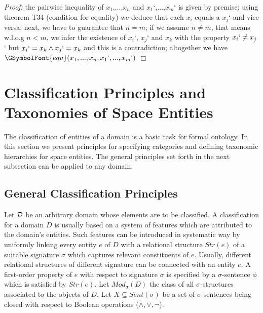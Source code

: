 \documentclass{ao2e}
\newcommand{\Gequ}{\ensuremath{\GSymbolFont{equ}}}
\begin{document}
{\noindent \textit{Proof:}	the pairwise inequality of  $x_{1}$,...,$x_{n}$ and $x_{1}$`,...,$x_{m}$` is given by premise; using theorem T34 (condition for equality) we deduce that each $x_{i}$ equals a $x_{j}$` and vice versa; next, we have to guarantee that $n=m$; if we assume $n \neq m$, that means w.l.o.g $n < m$, we infer the existence of $x_{i}$`, $x_{j}$` and $x_{k}$ with the property $x_{i}`\neq x_{j}$` but $x_{i}` = x_{k} \wedge x_{j}` = x_{k}$ and this is a contradiction; altogether we have $\Gequ(x_{1},...,x_{n},x_{1}`,...,x_{m}`)$ \hfill $\Box$  



						





\section{Classification Principles and Taxonomies of Space Entities}

The classification of entities of a domain is a basic task for formal ontology. In this section
we present principles for specifying categories and defining taxonomic hierarchies for space entities.
The general principles set forth in the next subsection can be applied to any domain.



\subsection{General Classification Principles}
Let ${\cal D}$ be an arbitrary domain whose elements are to be classified. A classification for a domain $D$
is usually based on a system of features which are attributed to the domain's entities. Such features can be
introduced in systematic way by uniformly linking every entity $e$ of $D$ with a relational structure
$Str(e)$ of a suitable signature $\sigma$ which captures relevant constituents of $e$.
Usually, different relational structures of different signature can be connected with an entity $e$. A first-order property of $e$ with respect to signature $\sigma$ is specified by a $\sigma$-sentence $\phi$ which is satisfied by $Str(e)$. Let $Mod_{\sigma}(D)$ the class of
all $\sigma$-structures associated to the objects of $D$. Let $X \subseteq Sent(\sigma)$ be a set of $\sigma$-sentences being closed with respect to Boolean operations ($\wedge, \vee, \neg$).

}
\end{document}
